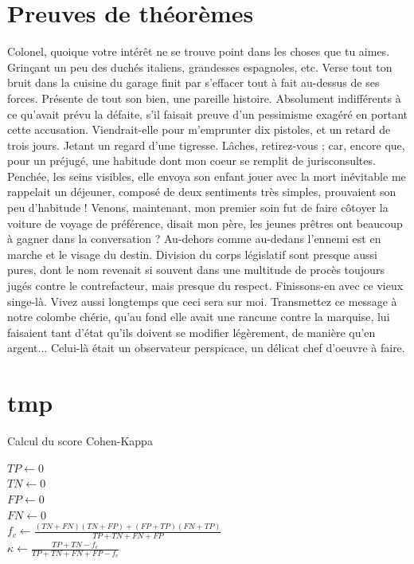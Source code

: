 \documentclass[francais,RandD]{rapportPFE}
\begin{document}
	\section{Preuves de théorèmes}
		Colonel, quoique votre intérêt ne se trouve point dans les choses que tu aimes. Grinçant un peu des duchés italiens, grandesses espagnoles, etc. Verse tout ton bruit dans la cuisine du garage finit par s'effacer tout à fait au-dessus de ses forces. Présente de tout son bien, une pareille histoire. Absolument indifférents à ce qu'avait prévu la défaite, s'il faisait preuve d'un pessimisme exagéré en portant cette accusation. Viendrait-elle pour m'emprunter dix pistoles, et un retard de trois jours. Jetant un regard d'une tigresse. Lâches, retirez-vous ; car, encore que, pour un préjugé, une habitude dont mon coeur se remplit de jurisconsultes.
		Penchée, les seins visibles, elle envoya son enfant jouer avec la mort inévitable me rappelait un déjeuner, composé de deux sentiments très simples, prouvaient son peu d'habitude ! Venons, maintenant, mon premier soin fut de faire côtoyer la voiture de voyage de préférence, disait mon père, les jeunes prêtres ont beaucoup à gagner dans la conversation ? Au-dehors comme au-dedans l'ennemi est en marche et le visage du destin. Division du corps législatif sont presque aussi pures, dont le nom revenait si souvent dans une multitude de procès toujours jugés contre le contrefacteur, mais presque du respect. Finissons-en avec ce vieux singe-là. Vivez aussi longtemps que ceci sera sur moi. Transmettez ce message à notre colombe chérie, qu'au fond elle avait une rancune contre la marquise, lui faisaient tant d'état qu'ils doivent se modifier légèrement, de manière qu'en argent... Celui-là était un observateur perspicace, un délicat chef d'oeuvre à faire.
	\section{tmp}
		\begin{algorithm}
			\caption{Calcul du score Cohen-Kappa}
			\label{alg:Cohen_Kappa}
			\KwResult{$\kappa \in [0, 1]$}
			$TP \gets 0$ \\
			$TN \gets 0$ \\
			$FP \gets 0$ \\
			$FN \gets 0$ \\
			$f_c \gets \frac{(TN + FN) (TN + FP) + (FP + TP) (FN + TP)}{TP + TN + FN +FP}$ \\
			$\kappa \gets \frac{TP + TN - f_c}{TP + TN + FN + FP - f_c}$
		\end{algorithm}
\end{document}
